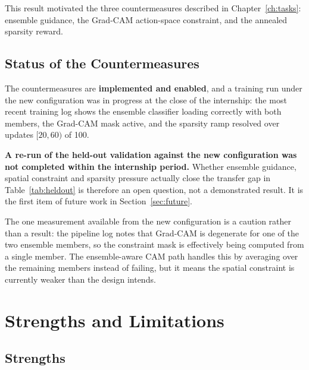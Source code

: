 This result motivated the three countermeasures described in
Chapter~\ref{ch:tasks}: ensemble guidance, the Grad-CAM action-space
constraint, and the annealed sparsity reward.

\subsection{Status of the Countermeasures}
\label{sec:status}

The countermeasures are \textbf{implemented and enabled}, and a training
run under the new configuration was in progress at the close of the
internship: the most recent training log shows the ensemble classifier
loading correctly with both members, the Grad-CAM mask active, and the
sparsity ramp resolved over updates $[20, 60)$ of 100.

\textbf{A re-run of the held-out validation against the new configuration
was not completed within the internship period.} Whether ensemble
guidance, spatial constraint and sparsity pressure actually close the
transfer gap in Table~\ref{tab:heldout} is therefore an open question,
not a demonstrated result. It is the first item of future work in
Section~\ref{sec:future}.

The one measurement available from the new configuration is a caution
rather than a result: the pipeline log notes that Grad-CAM is degenerate
for one of the two ensemble members, so the constraint mask is
effectively being computed from a single member. The ensemble-aware CAM
path handles this by averaging over the remaining members instead of
failing, but it means the spatial constraint is currently weaker than the
design intends.

\section{Strengths and Limitations}

\subsection{Strengths}

